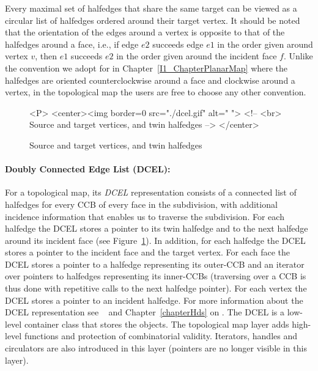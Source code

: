 Every maximal set of halfedges that share the same target can be viewed 
as a circular list of halfedges ordered %
around their target vertex.
It should be noted that the orientation of the edges around a vertex is 
opposite to that of the halfedges around a face, i.e., if edge $e2$
succeeds edge $e1$ in the order given around vertex $v$, then $e1$
succeeds $e2$ in the order given around the incident face $f$.
Unlike the convention we adopt
for  in Chapter~\ref{I1_ChapterPlanarMap} where the halfedges
are oriented counterclockwise around a face and clockwise around a vertex,
in the topological map the users are free to choose any other convention.

\begin{figure}
\begin{ccTexOnly}
    \centerline{
       }
\end{ccTexOnly}
\caption{Source and target vertices, and twin halfedges \label{fig:DCEL}}

\begin{ccHtmlOnly}
<P>
<center><img border=0 src="./dcel.gif" alt=" ">
<!-- <br> Source and target vertices, and twin halfedges -->
</center>
\end{ccHtmlOnly}
\end{figure}

\paragraph{Doubly Connected Edge List (DCEL):}
For a topological map, its {\em DCEL} representation consists of a
connected list of halfedges for every CCB of every face in the
subdivision, with additional incidence information that enables us to
traverse the subdivision. %
For each halfedge the DCEL
stores a pointer to its twin halfedge and to the next
halfedge around its incident face (see Figure~\ref{fig:DCEL}). In
addition, for each halfedge the DCEL stores a pointer to the incident
face and the target vertex.
For each face the DCEL stores a pointer to a halfedge representing
its outer-CCB and an iterator over pointers to halfedges representing
its inner-CCBs (traversing over a CCB is thus done with repetitive
calls to the next halfedge pointer).
For each vertex the DCEL stores a pointer to an incident halfedge. 
For more information about the DCEL
representation see ~\cite{bkos-cgaa-97} and Chapter~\ref{chapterHds}
on .
The DCEL is a low-level container class that stores the objects.
The topological map layer adds high-level functions and protection of
combinatorial validity. Iterators, handles and circulators are also
introduced in this layer (pointers are no longer visible in this layer).


